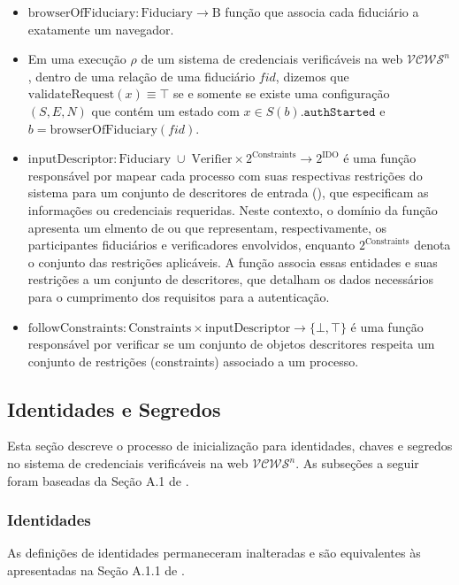 \begin{itemize}
  \item $ \text{browserOfFiduciary}:  \text{Fiduciary} \rightarrow \text{B}$ função que associa cada fiduciário a exatamente um navegador.
  \item Em uma execução $\rho$ de um sistema de credenciais verificáveis na web $\mathcal{VCWS}^n$, dentro de uma relação de uma fiduciário $fid$, dizemos que $\text{validateRequest}(x) \equiv \top$ se e somente se existe uma configuração $(S, E, N)$ que contém um estado com $x \in S(b).\texttt{authStarted}$ e $b = \text{browserOfFiduciary}(fid)$.
  \item $\text{inputDescriptor}: \text{Fiduciary} \; \cup \; \text{Verifier} \times 2^\text{Constraints} \rightarrow 2^{\text{IDO}}$ é uma função responsável por mapear cada processo com suas respectivas restrições do sistema para um conjunto de descritores de entrada (), que especificam as informações ou credenciais requeridas. Neste contexto, o domínio da função apresenta um elmento de  ou  que representam, respectivamente, os participantes fiduciários e verificadores envolvidos, enquanto $2^{\text{Constraints}}$ denota o conjunto das restrições aplicáveis. A função  associa essas entidades e suas restrições a um conjunto de descritores, que detalham os dados necessários para o cumprimento dos requisitos para a autenticação.
  \item $\text{followConstraints}: \text{Constraints} \times \text{inputDescriptor} \rightarrow \{\bot, \top\}$ é uma função responsável por verificar se um conjunto de objetos descritores respeita um conjunto de restrições (constraints) associado a um processo.
\end{itemize}

\subsection{Identidades e Segredos}

Esta seção descreve o processo de inicialização para identidades, chaves e segredos no sistema de credenciais verificáveis na web $\mathcal{VCWS}^n$. As subseções a seguir foram baseadas da Seção A.1 de \cite{hauck2023openid}. 

\subsubsection{Identidades}
As definições de identidades permaneceram inalteradas e são equivalentes às apresentadas na Seção A.1.1 de \cite{hauck2023openid}.

